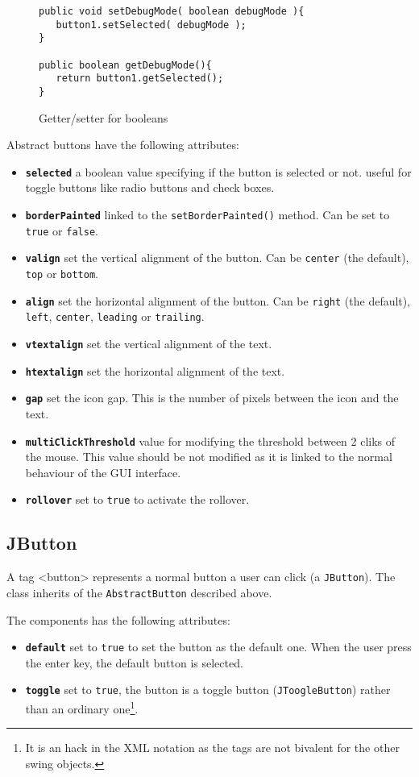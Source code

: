 \documentclass[a4paper,onecolumn,10pt]{book}
\newcommand{\jmethod}[1]{\texttt{\small #1()}}
\newcommand{\jclass}[1]{\texttt{\small #1}}
\newcommand{\tag}[1]{\textsf{<#1>}}
\newcommand{\attr}[1]{\texttt{\small \textbf{#1}}}
\begin{document}
\begin{figure}[htb]
\begin{lstlisting}
public void setDebugMode( boolean debugMode ){
   button1.setSelected( debugMode );
}

public boolean getDebugMode(){
   return button1.getSelected();
}
\end{lstlisting}
\caption{Getter/setter for booleans}\label{fig:getsetbool}
\end{figure}

 
Abstract buttons have the following attributes:
\begin{itemize}
   \item \attr{selected} a boolean value specifying if the button
		is selected or not. useful for toggle buttons like radio
		buttons and check boxes.
   \item \attr{borderPainted} linked to the \jmethod{setBorderPainted}
		method. Can be set to \verb|true| or \verb|false|.
	 \item \attr{valign} set the vertical alignment of the button. Can be
	 \verb|center| (the default), \verb|top| or \verb|bottom|.
	 \item \attr{align} set the horizontal alignment of the button. Can be
	 \verb|right| (the default), \verb|left|, \verb|center|,
	 \verb|leading| or \verb|trailing|.
	 \item \attr{vtextalign} set the vertical alignment of the text.
	 \item \attr{htextalign} set the horizontal alignment of the text.
	 \item \attr{gap} set the icon gap. This is the number
	 of pixels between the icon and the text.
	 \item \attr{multiClickThreshold} value for modifying the threshold
	 between 2 cliks of the mouse. This value should be not modified as
	 it is linked to the normal behaviour of the GUI interface.
	 \item \attr{rollover} set to \verb|true| to activate the rollover.
\end{itemize}

\subsection{\label{sec:JButton}JButton}
A tag \tag{button} represents a normal button a user can
click (a \jclass{JButton}). The class inherits of the
\jclass{AbstractButton} described above.

The components has the following attributes:
\begin{itemize}
	\item \attr{default} set to \verb|true| to set the button
	as the default one. When the user press the enter key, the
	default button is selected.
	\item \attr{toggle} set to \verb|true|, the button is a
	toggle button (\jclass{JToogleButton}) rather than 
	an ordinary one\footnote{It is an hack in the XML notation
	as the tags are not bivalent for the other swing objects.}.
\end{itemize}
\end{document}
